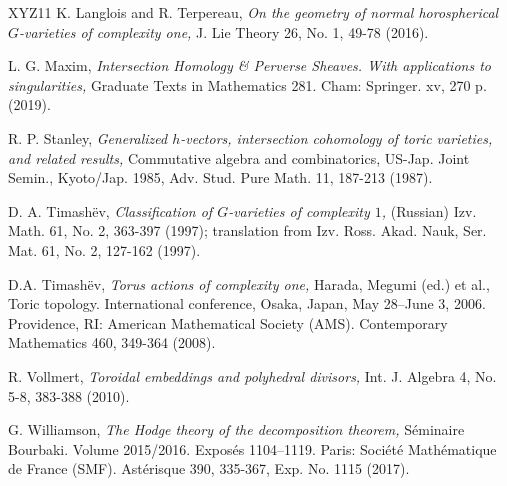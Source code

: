 \documentclass[11pt, reqno]{amsart}
\theoremstyle{plain}
\theoremstyle{definition}
\theoremstyle{remark}
\begin{document}
\begin{thebibliography}{XYZ11}
 K. Langlois and R. Terpereau, \emph{On the geometry of normal horospherical $G$-varieties of complexity one,}  J. Lie Theory 26, No. 1, 49-78 (2016). 


 L. G. Maxim, \emph{Intersection Homology \& Perverse Sheaves. With applications to singularities,}
Graduate Texts in Mathematics 281. Cham: Springer. xv, 270 p. (2019). 




 R. P. Stanley, \emph{Generalized $h$-vectors, intersection cohomology of toric varieties, and related results,}
Commutative algebra and combinatorics, US-Jap. Joint Semin., Kyoto/Jap. 1985, Adv. Stud. Pure Math. 11, 187-213 (1987). 


D. A. Timash\"ev, \emph{Classification of $G$-varieties of complexity $1$,} (Russian) Izv. Math. 61, No. 2, 363-397 (1997); translation from Izv. Ross. Akad. Nauk, Ser. Mat. 61, No. 2, 127-162 (1997).

 D.A. Timash\"ev, \emph{Torus actions of complexity one,} Harada, Megumi (ed.) et al., Toric topology. International conference, Osaka, Japan, May 28--June 3, 2006. Providence, RI: American Mathematical Society (AMS). Contemporary Mathematics 460, 349-364 (2008).

 R. Vollmert, \emph{Toroidal embeddings and polyhedral divisors,} Int. J. Algebra 4, No. 5-8, 383-388 (2010). 


 G. Williamson, \emph{The Hodge theory of the decomposition theorem,} S\'eminaire Bourbaki. Volume 2015/2016. Expos\'es 1104--1119. Paris: Soci\'et\'e Math\'ematique de France (SMF). Ast\'erisque 390, 335-367, Exp. No. 1115 (2017).
\end{thebibliography}
\end{document}
